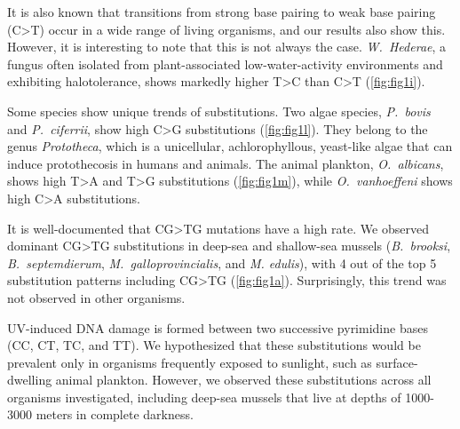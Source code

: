 \documentclass{article}
\begin{document}
  It is also known that transitions from strong base pairing to weak base pairing (C>T) occur in a wide range of living organisms, and our results also show this. However, it is interesting to note that this is not always the case. \textit{W.~Hederae}, a fungus often isolated from plant-associated low-water-activity environments and exhibiting halotolerance, shows markedly higher T>C than C>T (\autoref{fig:fig1i}).

  Some species show unique trends of substitutions.
  Two algae species, \textit{P.~bovis} and \textit{P.~ciferrii}, show high C>G substitutions (\autoref{fig:fig1l}). They belong to the genus \textit{Prototheca}, which is a unicellular, achlorophyllous, yeast-like algae that can induce protothecosis in humans and animals.
  The animal plankton, \textit{O.~albicans}, shows high T>A and T>G substitutions (\autoref{fig:fig1m}), while \textit{O.~vanhoeffeni} shows high C>A substitutions.

  It is well-documented that CG>TG mutations have a high rate. We observed dominant CG>TG substitutions in deep-sea and shallow-sea mussels (\textit{B.~brooksi}, \textit{B.~septemdierum}, \textit{M.~galloprovincialis}, and \textit{M. edulis}), with 4 out of the top 5 substitution patterns including CG>TG (\autoref{fig:fig1a}). Surprisingly, this trend was not observed in other organisms.

  UV-induced DNA damage is formed between two successive pyrimidine bases (CC, CT, TC, and TT). We hypothesized that these substitutions would be prevalent only in organisms frequently exposed to sunlight, such as surface-dwelling animal plankton. However, we observed these substitutions across all organisms investigated, including deep-sea mussels that live at depths of 1000-3000 meters in complete darkness.
\end{document}
